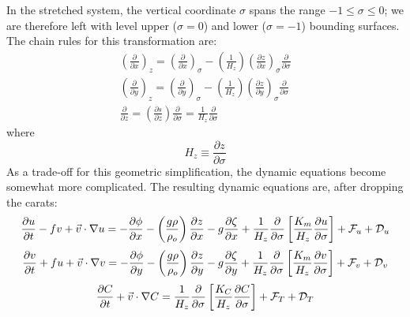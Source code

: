 In the stretched system, the vertical coordinate $\sigma$ spans the
range \mbox{$-1 \leq \sigma \leq 0$;} we are therefore left with
level upper ($\sigma = 0$) and lower ($\sigma = -1$) bounding
surfaces.  The chain rules for this transformation are:
\begin{gather*}
  \left( \frac{ \partial}{\partial x } \right)_z =
  \left( \frac{ \partial}{\partial x } \right)_\sigma -
  \left( \frac{ 1}{H_z } \right)
  \left( \frac{ \partial z}{\partial x } \right)_\sigma
  \frac{ \partial}{\partial \sigma}
\\
  \left( \frac{ \partial}{\partial y } \right)_z =
  \left( \frac{ \partial}{\partial y } \right)_\sigma -
  \left( \frac{ 1}{H_z } \right)
  \left( \frac{ \partial z}{\partial y } \right)_\sigma
  \frac{ \partial}{\partial \sigma}
\\
  \frac{ \partial}{\partial z } =
  \left( \frac{ \partial s}{\partial z } \right)
  \frac{ \partial}{\partial \sigma} =
  \frac{ 1}{H_z } \frac{ \partial}{\partial \sigma }
\end{gather*}
where
\[
  H_z \equiv \frac{ \partial z}{\partial \sigma }
\]
As a trade-off for this geometric
simplification, the dynamic equations become somewhat more
complicated.  The resulting dynamic equations are, after dropping the
carats:
\begin{equation}
  \frac{\partial u}{\partial t} - fv + \vec{v} \cdot \nabla u = - 
  \frac{\partial \phi}{\partial x} - \left( \frac{g\rho}
  {\rho_o} \right) \frac{\partial z}{\partial x} -
  g \frac{\partial \zeta}{\partial x} +
  \frac{ 1}{H_z } \frac{\partial}{\partial \sigma}
  \left[ \frac{K_m}{H_z} \frac{\partial u}{\partial \sigma} \right] +
  {\cal F}_u + {\cal D}_u
\label{st6}
\end{equation}
\begin{equation}
  \frac{\partial v}{\partial t} + fu + \vec{v} \cdot \nabla v = - 
  \frac{\partial \phi}{\partial y} - \left( \frac{g\rho}
  {\rho_o} \right) \frac{\partial z}{\partial y} -
  g \frac{\partial \zeta}{\partial y} +
  \frac{ 1}{H_z } \frac{\partial}{\partial \sigma}
  \left[ \frac{K_m}{H_z} \frac{\partial v}{\partial \sigma} \right] +
  {\cal F}_v + {\cal D}_v
\end{equation}
\begin{equation}
  \frac{\partial C}{\partial t} + \vec{v} \cdot \nabla C
  = \frac{ 1}{H_z } \frac{\partial}{\partial \sigma}
  \left[ \frac{K_C}{H_z} \frac{\partial C}{\partial \sigma} \right] +
  {\cal F}_{T} + {\cal D}_{T}
\end{equation}
